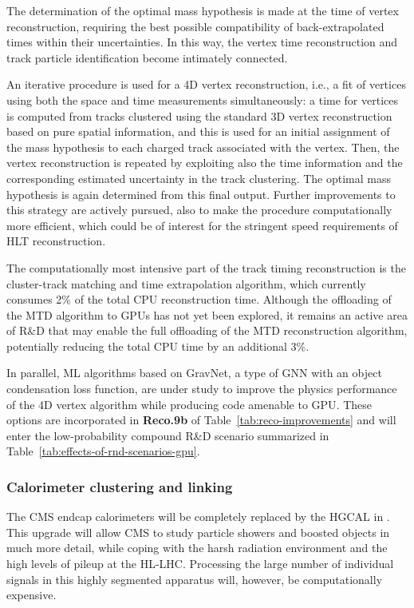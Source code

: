 The determination of the optimal mass hypothesis is made at the time of vertex reconstruction, requiring the best possible compatibility of back-extrapolated times within their uncertainties. In this way, the vertex time reconstruction and track particle identification become intimately connected. 

An iterative procedure is used for a 4D vertex reconstruction, i.e., a fit of vertices using both the space and time measurements simultaneously: a time for vertices is computed from tracks clustered using the standard 3D vertex reconstruction based on pure spatial information, and this is used for an initial assignment of the mass hypothesis to each charged track associated with the vertex. Then, the vertex reconstruction is repeated by exploiting also the time information and the corresponding estimated uncertainty in the track clustering. The optimal mass hypothesis is again determined from this final output. Further improvements to this strategy are actively pursued, also to make the procedure computationally more efficient, which could be of interest for the stringent speed requirements of \gls{HLT} reconstruction.

The computationally most intensive part of the track timing reconstruction is the cluster-track matching and time extrapolation algorithm, which currently consumes 2\% of the total \gls{CPU} reconstruction time.
Although the offloading of the \gls{MTD} algorithm to \glspl{GPU} has not yet been explored, it remains an active area of R\&D that may enable the full offloading of the \gls{MTD} reconstruction algorithm, potentially reducing the total \gls{CPU} time by an additional 3\%. 

In parallel, ML algorithms based on GravNet, a type of \gls{GNN} with an object condensation loss function, are under study to improve the physics performance of the 4D vertex algorithm while producing code amenable to \gls{GPU}.
These options are incorporated in \textbf{Reco.9b} of Table~\ref{tab:reco-improvements} and will enter the low-probability compound R\&D scenario summarized in Table~\ref{tab:effects-of-rnd-scenarios-gpu}.


\subsubsection{Calorimeter clustering and linking}

The CMS endcap calorimeters will be completely replaced by the \gls{HGCAL} in \PhaseTwo. This upgrade will allow CMS to study particle showers and boosted objects in much more detail, while coping with the harsh radiation environment and the high levels of pileup at the \gls{HL-LHC}. Processing the large number of individual signals in this highly segmented apparatus will, however, be computationally expensive.

